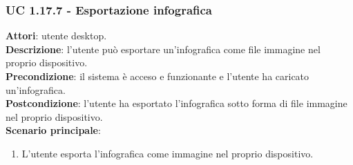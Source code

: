 \subsubsection{UC 1.17.7 - Esportazione infografica}{
	\label{uc1.17.7}
	\textbf{Attori}: utente desktop. \\
	\textbf{Descrizione}: l'utente può esportare un'infografica come file immagine nel proprio dispositivo. \\
	\textbf{Precondizione}: il sistema è acceso e funzionante e l'utente ha caricato un'infografica.	\\
	\textbf{Postcondizione}: l'utente ha esportato l'infografica sotto forma di file immagine nel proprio dispositivo.\\
	\textbf{Scenario principale}:
	\begin{enumerate}
		\item L'utente esporta l'infografica come immagine nel proprio dispositivo.
	\end{enumerate}			
	}